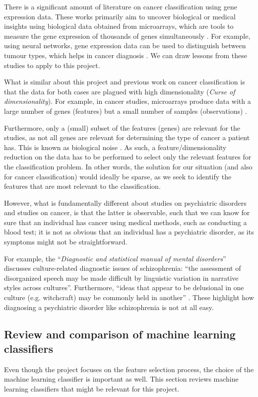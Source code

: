 \documentclass[12pt, twoside, a4paper]{article}
\begin{document}
There is a significant amount of literature on cancer classification using gene expression data. These works primarily aim to uncover biological or medical insights using biological data obtained from microarrays, which are tools to measure the gene expression of thousands of genes simultaneously \citep{RefWorks:79}. For example, using neural networks, gene expression data can be used to distinguish between tumour types, which helps in cancer diagnosis \citep{RefWorks:80, RefWorks:88}. We can draw lessons from these studies to apply to this project.

What is similar about this project and previous work on cancer classification is that the data for both cases are plagued with high dimensionality (\textit{Curse of dimensionality}). For example, in cancer studies, microarrays produce data with a large number of genes (features) but a small number of samples (observations) \cite{RefWorks:88}.

Furthermore, only a (small) subset of the features (genes) are relevant for the studies, as not all genes are relevant for determining the type of cancer a patient has. This is known as biological noise \cite{RefWorks:89}. As such, a feature/dimensionality reduction on the data has to be performed to select only the relevant features for the classification problem. In other words, the solution for our situation (and also for cancer classification) would ideally be sparse, as we seek to identify the features that are most relevant to the classification.

However, what is fundamentally different about studies on psychiatric disorders and studies on cancer, is that the latter is observable, such that we can know for sure that an individual has cancer using medical methods, such as conducting a blood test; it is not as obvious that an individual has a psychiatric disorder, as its symptoms might not be straightforward.

For example, the ``\textit{Diagnostic and statistical manual of mental disorders}'' discusses culture-related diagnostic issues of schizophrenia: ``the assessment of disorganized speech may be made difficult by linguistic variation in narrative styles across cultures''. Furthermore, ``ideas that appear to be delusional in one culture (e.g. witchcraft) may be commonly held in another'' \cite{RefWorks:114}. These highlight how diagnosing a psychiatric disorder like schizophrenia is not at all easy.

\subsection{Review and comparison of machine learning classifiers} \label{bg_ML}
Even though the project focuses on the feature selection process, the choice of the machine learning classifier is important as well. This section reviews machine learning classifiers that might be relevant for this project.
\end{document}
